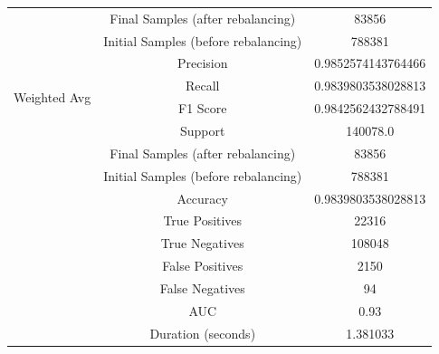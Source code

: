 \begin{longtable}{|c|c|c|}
 & Final Samples (after rebalancing) & 83856 \\
 & Initial Samples (before rebalancing) & 788381 \\
\hline
\multirow{4}{*}{Weighted Avg} & Precision & 0.9852574143764466 \\
 & Recall & 0.9839803538028813 \\
 & F1 Score & 0.9842562432788491 \\
 & Support & 140078.0 \\
 & Final Samples (after rebalancing) & 83856 \\
 & Initial Samples (before rebalancing) & 788381 \\
\hline
& Accuracy & 0.9839803538028813 \\ \hline
& True Positives & 22316 \\ \hline
& True Negatives & 108048 \\ \hline
& False Positives & 2150 \\ \hline
& False Negatives & 94 \\ \hline
& AUC & 0.93 \\ \hline
& Duration (seconds) & 1.381033 \\ \hline
\end{longtable}


